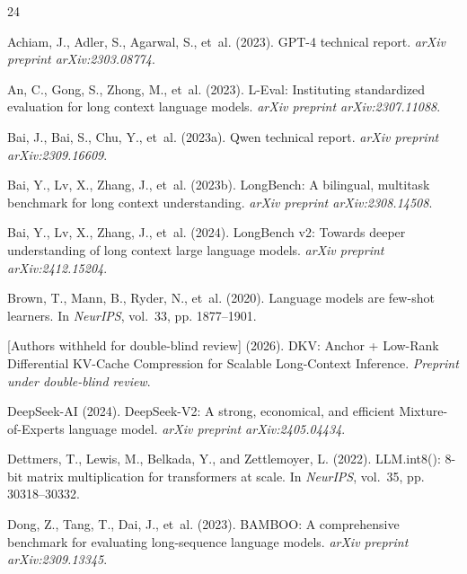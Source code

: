 \documentclass[10pt]{article}
\theoremstyle{definition}
\begin{document}

\begingroup
\small
\begin{thebibliography}{24}


 Achiam, J., Adler, S., Agarwal, S., et~al. (2023). GPT-4 technical report. \textit{arXiv preprint arXiv:2303.08774}.

 An, C., Gong, S., Zhong, M., et~al. (2023). L-Eval: Instituting standardized evaluation for long context language models. \textit{arXiv preprint arXiv:2307.11088}.

 Bai, J., Bai, S., Chu, Y., et~al. (2023a). Qwen technical report. \textit{arXiv preprint arXiv:2309.16609}.

 Bai, Y., Lv, X., Zhang, J., et~al. (2023b). LongBench: A bilingual, multitask benchmark for long context understanding. \textit{arXiv preprint arXiv:2308.14508}.

 Bai, Y., Lv, X., Zhang, J., et~al. (2024). LongBench v2: Towards deeper understanding of long context large language models. \textit{arXiv preprint arXiv:2412.15204}.

 Brown, T., Mann, B., Ryder, N., et~al. (2020). Language models are few-shot learners. In \textit{NeurIPS}, vol.~33, pp. 1877--1901.

 [Authors withheld for double-blind review] (2026). DKV: Anchor + Low-Rank Differential KV-Cache Compression for Scalable Long-Context Inference. \textit{Preprint under double-blind review}.

 DeepSeek-AI (2024). DeepSeek-V2: A strong, economical, and efficient Mixture-of-Experts language model. \textit{arXiv preprint arXiv:2405.04434}.

 Dettmers, T., Lewis, M., Belkada, Y., and Zettlemoyer, L. (2022). LLM.int8(): 8-bit matrix multiplication for transformers at scale. In \textit{NeurIPS}, vol.~35, pp. 30318--30332.

 Dong, Z., Tang, T., Dai, J., et~al. (2023). BAMBOO: A comprehensive benchmark for evaluating long-sequence language models. \textit{arXiv preprint arXiv:2309.13345}.


\end{thebibliography}
\end{document}
